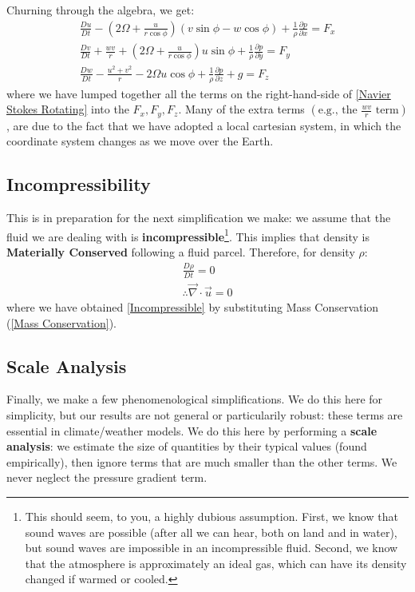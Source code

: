 Churning through the algebra, we get:
\begin{align*}
    \frac{Du}{Dt}-\left( 2\Omega+\frac{u}{r\cos\phi} \right)\left( v\sin\phi-w\cos\phi \right)+\frac{1}{\rho}\frac{\partial p}{\partial x}
    =F_x\\
    \frac{Dv}{Dt}+\frac{wv}{r}+\left( 2\Omega+\frac{u}{r\cos\phi} \right)u\sin\phi+\frac{1}{\rho}\frac{\partial p}{\partial y}=F_y\\
    \frac{Dw}{Dt}-\frac{u^2+v^2}{r}-2\Omega u \cos\phi+\frac{1}{\rho}\frac{\partial p}{\partial z}+g=F_z
\end{align*}
where we have lumped together all the terms on the right-hand-side of \ref{Navier Stokes Rotating} into the $F_x, F_y, F_z$. Many of the extra terms $\left( \text{e.g., the } \frac{wv}{r} \text{ term}\right)$, are due to the fact that we have adopted a local cartesian system, in which the coordinate system changes as we move over the Earth. 

\subsection{Incompressibility}

This is in preparation for the next simplification we make: we assume that the fluid we are dealing with is \textbf{incompressible}\footnote{
    This should seem, to you, a highly dubious assumption. First, we know that sound waves are possible (after all we can hear, both on land and in water), but sound waves are impossible in an incompressible fluid. Second, we know that the atmosphere is approximately an ideal gas, which can have its density changed if warmed or cooled.
}. This implies that density is \textbf{Materially Conserved} following a fluid parcel. Therefore, for density $\rho$:
\begin{align}
    \frac{D\rho}{Dt}=0\nonumber\\
    \therefore \boxed{\vec{\nabla}\cdot \vec{u}=0}\label{Incompressible}
\end{align}
where we have obtained \ref{Incompressible} by substituting Mass Conservation (\ref{Mass Conservation}).

\subsection{Scale Analysis}

Finally, we make a few phenomenological simplifications. We do this here for simplicity, but our results are not general or particularily robust: these terms are essential in climate/weather models.
We do this here by performing a \textbf{scale analysis}: we estimate the size of quantities by their typical values (found empirically), then ignore terms that are much smaller than the other terms. We never neglect the pressure gradient term. \newline

